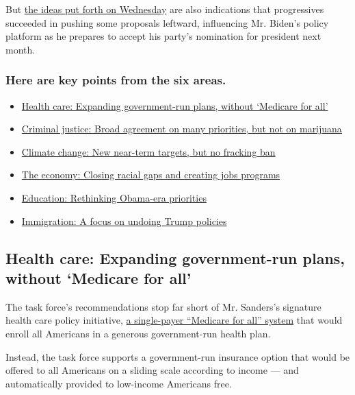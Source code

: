 But
\href{https://www.nytimes3xbfgragh.onion/2020/07/08/us/politics/biden-bernie-sanders.html}{the
ideas put forth on Wednesday} are also indications that progressives
succeeded in pushing some proposals leftward, influencing Mr. Biden's
policy platform as he prepares to accept his party's nomination for
president next month.

\hypertarget{here-are-key-points-from-the-six-areas}{%
\subsubsection{Here are key points from the six
areas.}\label{here-are-key-points-from-the-six-areas}}

\begin{itemize}
\tightlist
\item
  \protect\hyperlink{link-42d793b5}{Health care: Expanding
  government-run plans, without `Medicare for all'}
\item
  \protect\hyperlink{link-4936622c}{Criminal justice: Broad agreement on
  many priorities, but not on marijuana}
\item
  \protect\hyperlink{link-53fcae28}{Climate change: New near-term
  targets, but no fracking ban}
\item
  \protect\hyperlink{link-5e9b5b24}{The economy: Closing racial gaps and
  creating jobs programs}
\item
  \protect\hyperlink{link-a0f0a46}{Education: Rethinking Obama-era
  priorities}
\item
  \protect\hyperlink{link-17b99a1d}{Immigration: A focus on undoing
  Trump policies}
\end{itemize}

\hypertarget{health-care-expanding-government-run-plans-without-medicare-for-all}{%
\subsection{Health care: Expanding government-run plans, without
`Medicare for
all'}\label{health-care-expanding-government-run-plans-without-medicare-for-all}}

The task force's recommendations stop far short of Mr. Sanders's
signature health care policy initiative,
\href{https://www.nytimes3xbfgragh.onion/2019/06/23/us/politics/2020-democrats-medicare-for-all-public-option.html}{a
single-payer ``Medicare for all'' system} that would enroll all
Americans in a generous government-run health plan.

Instead, the task force supports a government-run insurance option that
would be offered to all Americans on a sliding scale according to income
--- and automatically provided to low-income Americans free.


